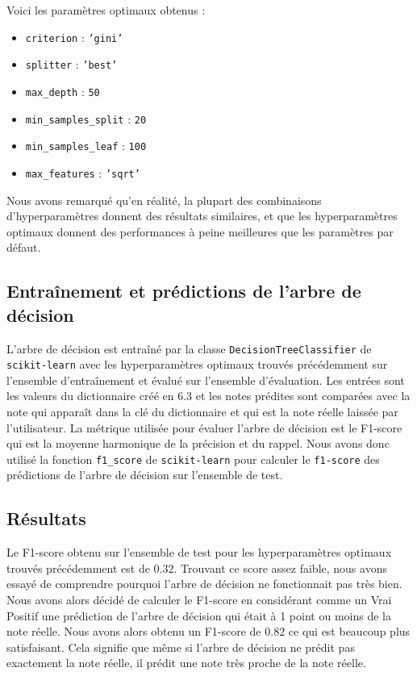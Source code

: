 \documentclass{article}
\begin{document}
\noindent Voici les paramètres optimaux obtenus :

\begin{itemize}
  \item \texttt{criterion} : \texttt{'gini'}
  \item \texttt{splitter} : \texttt{'best'}
  \item \texttt{max\_depth} : \texttt{50}
  \item \texttt{min\_samples\_split} : \texttt{20}
  \item \texttt{min\_samples\_leaf} : \texttt{100}
  \item \texttt{max\_features} : \texttt{'sqrt'}
\end{itemize}

Nous avons remarqué qu'en réalité, la plupart des combinaisons d'hyperparamètres
donnent des résultats similaires, et que les hyperparamètres optimaux donnent
des performances à peine meilleures que les paramètres par défaut.

\subsection{Entraînement et prédictions de l'arbre de décision}
L'arbre de décision est entraîné par la classe \texttt{DecisionTreeClassifier}
de \texttt{scikit-learn} avec les hyperparamètres optimaux trouvés précédemment 
sur l'ensemble d'entraînement et évalué sur l'ensemble d'évaluation.
\vskip 0.25cm
Les entrées sont les valeurs du dictionnaire créé en 6.3 et les notes prédites
sont comparées avec la note qui apparaît dans la clé du dictionnaire et qui est
la note réelle laissée par l'utilisateur.
\vskip 0.25cm
La métrique utilisée pour évaluer l'arbre de décision est le F1-score
qui est la moyenne harmonique de la précision et du rappel. Nous avons donc 
utilisé la fonction \texttt{f1\_score} de \texttt{scikit-learn} pour calculer
le \texttt{f1-score} des prédictions de l'arbre de décision sur l'ensemble
de test.

\subsection{Résultats}
Le F1-score obtenu sur l'ensemble de test pour les hyperparamètres optimaux
trouvés précédemment est de $0.32$.
\vskip 0.25cm
Trouvant ce score assez faible, nous avons essayé de comprendre pourquoi
l'arbre de décision ne fonctionnait pas très bien. Nous avons alors décidé
de calculer le F1-score en considérant comme un Vrai Positif une prédiction
de l'arbre de décision qui était à 1 point ou moins de la note réelle.
\vskip 0.25cm
Nous avons alors obtenu un F1-score de $0.82$ ce qui est beaucoup plus
satisfaisant. Cela signifie que même si l'arbre de décision ne prédit pas
exactement la note réelle, il prédit une note très proche de la note réelle.
\end{document}
